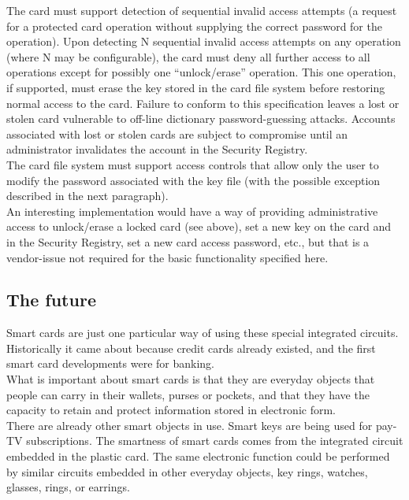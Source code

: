 \begin{htmllist}
    The card must support detection of sequential invalid access attempts
    (a request for a protected card operation without supplying the correct
    password for the operation). Upon detecting N sequential invalid access
    attempts on any operation (where N may be configurable), the card must
    deny all further access to all operations except for possibly one
    ``unlock/erase'' operation. This one operation, if supported, must
    erase the key stored in the card file system before restoring normal
    access to the card. Failure to conform to this specification leaves a
    lost or stolen card vulnerable to off-line dictionary password-guessing
    attacks. Accounts associated with lost or stolen cards are subject to
    compromise until an administrator invalidates the account in the
    Security Registry.\\
    
    The card file system must support access controls that allow only the
    user to modify the password associated with the key file (with the
    possible exception described in the next paragraph).\\
    
    An interesting implementation would have a way of providing
    administrative access to unlock/erase a locked card (see above), set a
    new key on the card and in the Security Registry, set a new card access
    password, etc., but that is a vendor-issue not required for the basic
    functionality specified here.
\end{htmllist}

\subsection{The future}
Smart cards are just one particular way of using these special
integrated circuits. Historically it came about because credit cards
already existed, and the first smart card developments were for banking.\\

What is important about smart cards is that they are everyday objects
that people can carry in their wallets, purses or pockets, and that
they have the capacity to retain and protect information stored in
electronic form.\\

There are already other smart objects in use. Smart keys are being used
for pay-TV subscriptions. The smartness of smart cards comes from the
integrated circuit embedded in the plastic card. The same electronic
function could be performed by similar circuits embedded in other
everyday objects, key rings, watches, glasses, rings, or earrings.\\


